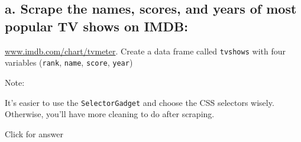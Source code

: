 \documentclass[
]{book}
\begin{document}
\hypertarget{a.-scrape-the-names-scores-and-years-of-most-popular-tv-shows-on-imdb}{%
\subsection{a. Scrape the names, scores, and years of most popular TV shows on IMDB:}\label{a.-scrape-the-names-scores-and-years-of-most-popular-tv-shows-on-imdb}}

\href{http://www.imdb.com/chart/tvmeter}{www.imdb.com/chart/tvmeter}. Create a data frame called \texttt{tvshows} with four variables
(\texttt{rank}, \texttt{name}, \texttt{score}, \texttt{year})

Note:

It's easier to use the \texttt{SelectorGadget} and choose the CSS selectors wisely. Otherwise, you'll have more cleaning to do after scraping.

Click for answer
\end{document}
